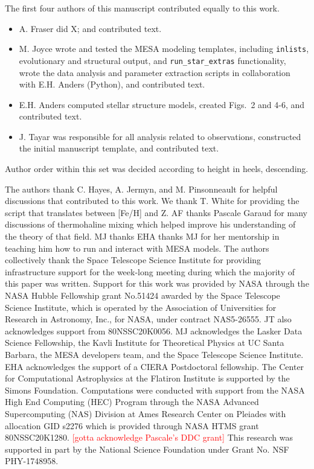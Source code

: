 \documentclass[linenumbers,twocolumn]{aastex62}
\begin{document}
\begin{acknowledgements}
The first four authors of this manuscript contributed equally to this work. 
\begin{itemize}
\item[] A. Fraser did X; and contributed text.
%
\item[] M. Joyce wrote and tested the MESA modeling templates, including \texttt{inlists}, evolutionary and structural output, and \texttt{run\_star\_extras} functionality, wrote the data analysis and parameter extraction scripts in collaboration with E.H. Anders (Python), and contributed text.
%
\item[] E.H. Anders computed stellar structure models, created Figs.~2 and 4-6, and contributed text.
%
\item[] J. Tayar was responsible for all analysis related to observations, constructed the initial manuscript template, and contributed text. 
%
\end{itemize}
Author order within this set was decided according to height in heels, descending.

The authors thank C. Hayes, A. Jermyn, and M. Pinsonneault for helpful discussions that contributed to this work.  
We thank T. White for providing the script that translates between [Fe/H] and Z.
%
AF thanks Pascale Garaud for many discussions of thermohaline mixing which helped improve his understanding of the theory of that field.
MJ thanks  
EHA thanks MJ for her mentorship in teaching him how to run and interact with MESA models.
%
%
The authors collectively thank the Space Telescope Science Institute for providing infrastructure support for the week-long meeting during which the majority of this paper was written.
%
Support for this work was provided by NASA through the NASA Hubble Fellowship grant No.51424 awarded by the Space Telescope Science Institute, which is operated by the Association of Universities for Research in Astronomy, Inc., for NASA, under contract NAS5-26555. JT also acknowledges support from 80NSSC20K0056. 
MJ acknowledges the Lasker Data Science Fellowship, the Kavli Institute for Theoretical Physics at UC Santa Barbara, the MESA developers team, and the Space Telescope Science Institute.
EHA acknowledges the support of a CIERA Postdoctoral fellowship.
 The Center for Computational Astrophysics at the Flatiron Institute is
supported by the Simons Foundation.
 Computations were conducted with support from the NASA High End Computing (HEC) Program through the NASA Advanced Supercomputing (NAS) Division at Ames Research Center on Pleiades with allocation GID s2276 which is provided through NASA HTMS grant 80NSSC20K1280. \textcolor{red}{[gotta acknowledge Pascale's DDC grant]}
This research was supported in part by the National Science Foundation under Grant No. NSF PHY-1748958.


\end{acknowledgements}
\end{document}
